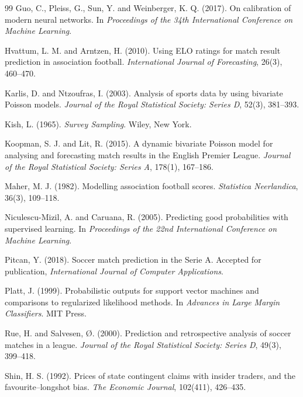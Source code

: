 \documentclass[11pt]{article}
\begin{document}
\begin{thebibliography}{99}
Guo, C., Pleiss, G., Sun, Y. and Weinberger, K. Q. (2017).
On calibration of modern neural networks.
In \emph{Proceedings of the 34th International Conference on Machine Learning}.

Hvattum, L. M. and Arntzen, H. (2010).
Using ELO ratings for match result prediction in association football.
\emph{International Journal of Forecasting}, 26(3), 460--470.

Karlis, D. and Ntzoufras, I. (2003).
Analysis of sports data by using bivariate Poisson models.
\emph{Journal of the Royal Statistical Society: Series D}, 52(3), 381--393.

Kish, L. (1965).
\emph{Survey Sampling}. Wiley, New York.

Koopman, S. J. and Lit, R. (2015).
A dynamic bivariate Poisson model for analysing and forecasting match results
in the English Premier League.
\emph{Journal of the Royal Statistical Society: Series A}, 178(1), 167--186.

Maher, M. J. (1982).
Modelling association football scores.
\emph{Statistica Neerlandica}, 36(3), 109--118.

Niculescu-Mizil, A. and Caruana, R. (2005).
Predicting good probabilities with supervised learning.
In \emph{Proceedings of the 22nd International Conference on Machine Learning}.

Pitcan, Y. (2018).
Soccer match prediction in the Serie A.
Accepted for publication, \emph{International Journal of Computer
Applications}.

Platt, J. (1999).
Probabilistic outputs for support vector machines and comparisons to regularized
likelihood methods.
In \emph{Advances in Large Margin Classifiers}. MIT Press.

Rue, H. and Salvesen, {\O}. (2000).
Prediction and retrospective analysis of soccer matches in a league.
\emph{Journal of the Royal Statistical Society: Series D}, 49(3), 399--418.

Shin, H. S. (1992).
Prices of state contingent claims with insider traders, and the
favourite--longshot bias.
\emph{The Economic Journal}, 102(411), 426--435.


\end{thebibliography}
\end{document}
